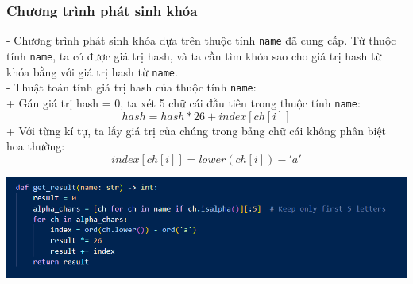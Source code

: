 \subsubsection{Chương trình phát sinh khóa}
- Chương trình phát sinh khóa dựa trên thuộc tính \texttt{name} đã cung cấp. Từ thuộc tính \texttt{name}, ta có được giá trị hash, và ta cần tìm khóa sao cho giá trị hash từ khóa bằng với giá trị hash từ \texttt{name}.\\
- Thuật toán tính giá trị hash của thuộc tính \texttt{name}:\\
+ Gán giá trị hash = 0, ta xét 5 chữ cái đầu tiên trong thuộc tính \texttt{name}: 
\[
    hash = hash*26 + index[ch[i]]
\]
+ Với từng kí tự, ta lấy giá trị của chúng trong bảng chữ cái không phân biệt hoa thường:
\[
    index[ch[i]] = lower(ch[i]) - 'a'
\]
\begin{center}
    \includegraphics[width=\textwidth]{img/file-2/code1.PNG}
\end{center}

